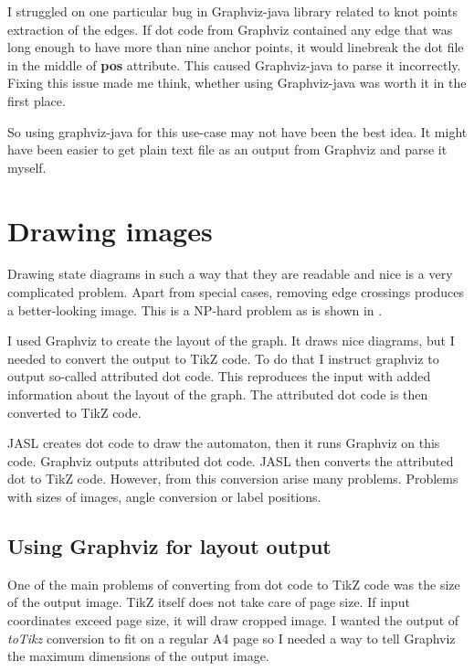 \documentclass{ctuthesis}
\begin{document}
I struggled on one particular bug in Graphviz-java library related to knot points extraction of the edges. If dot code from Graphviz contained any edge that was long enough to have more than nine anchor points, it would linebreak the dot file in the middle of \textbf{pos} attribute. This caused Graphviz-java to parse it incorrectly. Fixing this issue made me think, whether using Graphviz-java was worth it in the first place.

So using graphviz-java for this use-case may not have been the best idea. It might have been easier to get plain text file as an output from Graphviz and parse it myself. 

\chapter{Drawing images}
Drawing state diagrams in such a way that they are readable and nice is a very complicated problem. Apart from special cases, removing edge crossings produces a better-looking image. This is a NP-hard problem as is shown in \cite{crossing-problem}.

I used Graphviz to create the layout of the graph. It draws nice diagrams, but I needed to convert the output to TikZ code. To do that I instruct graphviz to output so-called attributed dot code. This reproduces the input with added information about the layout of the graph. The attributed dot code is then converted to TikZ code. 


JASL creates dot code to draw the automaton, then it runs Graphviz on this code. Graphviz outputs attributed dot code. JASL then converts the attributed dot to TikZ code. However, from this conversion arise many problems. Problems with sizes of images, angle conversion or label positions. 

\section{Using Graphviz for layout output}
\label{sec:problems_graphviz}
One of the main problems of converting from dot code to TikZ code was the size of the output image. TikZ itself does not take care of page size. If input coordinates exceed page size, it will draw cropped image. I wanted the output of \textit{toTikz} conversion to fit on a regular A4 page so I needed a way to tell Graphviz the maximum dimensions of the output image. 
\end{document}
